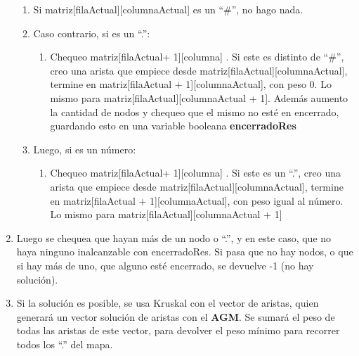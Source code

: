 \begin{enumerate}
{			\begin{enumerate}
				\item{
					Si matriz[filaActual][columnaActual] es un “\#”, no hago nada.
				}
				\item{
					Caso contrario, si es un “.”:
				}
				\begin{enumerate}
						\item{
							Chequeo matriz[filaActual+ 1][columna] . Si este es distinto de “\#”, creo una arista que empiece desde matriz[filaActual][columnaActual], termine en matriz[filaActual + 1][columnaActual], con peso 0. Lo mismo para matriz[filaActual][columnaActual + 1]. Además aumento la cantidad de nodos y chequeo que el mismo no esté en encerrado, guardando esto en una variable booleana \textbf{encerradoRes}
						}
				\end{enumerate}
				\item{
					Luego, si es un número:
				}
				\begin{enumerate}
						\item{
							Chequeo matriz[filaActual+ 1][columna] . Si este es un “.”, creo una arista que empiece desde matriz[filaActual][columnaActual], termine en matriz[filaActual + 1][columnaActual], con peso igual al número. Lo mismo para matriz[filaActual][columnaActual + 1]
						}
				\end{enumerate}
			\end{enumerate}
			}
			\item{
			    Luego se chequea que hayan más de un nodo o “.”, y en este caso, que no haya ninguno inalcanzable con encerradoRes. Si pasa que no hay nodos, o que si hay más de uno, que alguno esté encerrado, se devuelve -1 (no hay solución).
			}
			\item{
			 	Si la solución es posible, se usa Kruskal con el vector de aristas, quien generará un vector solución de aristas con el \textbf{AGM}. Se sumará el peso de todas las aristas de este vector, para devolver el peso mínimo para recorrer todos los “.” del mapa.
			}
	\end{enumerate}

